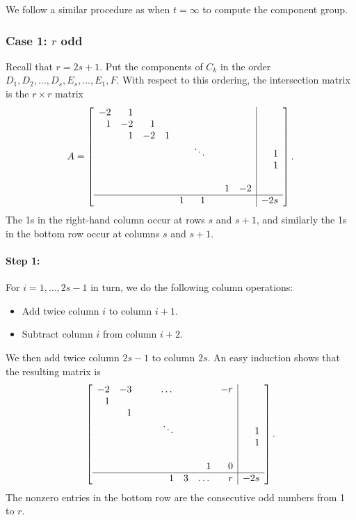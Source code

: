 \documentclass[reqno]{amsart}
\theoremstyle{definition}
\theoremstyle{remark}
\begin{document}
We follow a similar procedure as when $t = \infty$ to compute the component group. 

\subsubsection{Case 1: $r$ odd}
\label{sec:case-1:-r-odd}

Recall that $r = 2s + 1$. Put the components of $C_k$ in the order $D_1, D_2, \dots, D_{s}, E_{s}, \dots, E_1, F$. With respect to this ordering, the intersection matrix is the $r \times r$ matrix
\[
A = \left[\begin{array}{rrrrrrrrr|rr}
  -2 & 1 & & & & & & & & \\
  1 & -2 & 1 & & & & & & & \\
  & 1 & -2 & 1 & & & & & & \\
  & & & & & \ddots & & & & 1 \\
  & & & & & & & & & 1 \\
  & & & & & & & & & \\
  & & & & & & & 1 & -2 & \\ \hline
  & & & & 1 & 1 & & & & -2s
\end{array}\right].
\]
The 1s in the right-hand column occur at rows $s$ and $s+1$, and similarly the 1s in the bottom row occur at columns $s$ and $s+1$.

\paragraph{Step 1:}
\label{sec:step-1-odd}

For $i = 1, \dots, 2s-1$ in turn, we do the following column operations:
\begin{itemize}
    \item Add twice column $i$ to column $i+1$.
    \item Subtract column $i$ from column $i+2$.
\end{itemize}
We then add twice column $2s-1$ to column $2s$. An easy induction shows that the resulting matrix is
\[
\left[\begin{array}{rrrrrrrr|r}
  -2 & -3 & & & \dots & & & -r & \\
  1 & & & & & & & & \\
  & 1 & & & & & & & \\
  & & & & \ddots & & & & 1 \\
  & & & &  & & & & 1 \\
  & & & &  & & & & \\
  & & & & & & 1 & 0 & \\ \hline
  & & & & 1 & 3 & \dots & r & -2s
\end{array}\right].
\]
The nonzero entries in the bottom row are the consecutive odd numbers from 1 to $r$.
\end{document}
